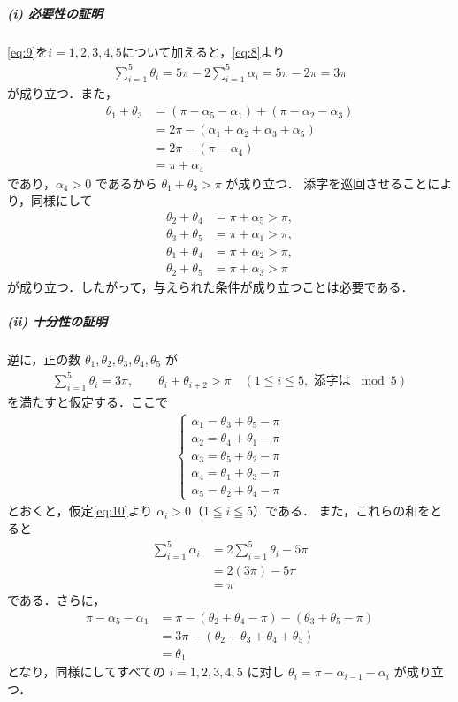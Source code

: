 \documentclass[../../main.tex]{subfiles}
\begin{document}
\subparagraph{(i) 必要性の証明}

\cref{eq:9}を$i=1,2,3,4,5$について加えると，\cref{eq:8}より
\begin{align}
  \sum_{i=1}^5 \theta_i = 5\pi - 2\sum_{i=1}^5 \alpha_i = 5\pi - 2\pi = 3\pi
\end{align}
が成り立つ．また，
\begin{align}
  \theta_1 + \theta_3 &= (\pi - \alpha_5 - \alpha_1) + (\pi - \alpha_2 - \alpha_3) \nonumber\\
  &= 2\pi - (\alpha_1 + \alpha_2 + \alpha_3 + \alpha_5) \nonumber\\
  &= 2\pi - (\pi - \alpha_4) \nonumber\\
  &= \pi + \alpha_4
\end{align}
であり，$\alpha_4 > 0$ であるから $\theta_1 + \theta_3 > \pi$ が成り立つ．
添字を巡回させることにより，同様にして
\begin{align}
  \theta_2 + \theta_4 &= \pi + \alpha_5 > \pi, \nonumber\\
  \theta_3 + \theta_5 &= \pi + \alpha_1 > \pi, \nonumber\\
  \theta_1 + \theta_4 &= \pi + \alpha_2 > \pi, \nonumber\\
  \theta_2 + \theta_5 &= \pi + \alpha_3 > \pi
\end{align}
が成り立つ．したがって，与えられた条件が成り立つことは必要である．

\subparagraph{(ii) 十分性の証明}

逆に，正の数 $\theta_1, \theta_2, \theta_3, \theta_4, \theta_5$ が
\begin{align}
  \sum_{i=1}^5 \theta_i = 3\pi, \qquad \theta_i + \theta_{i+2} > \pi \quad (1 \leqq i \leqq 5, \text{ 添字は } \bmod 5) \label{eq:10}
\end{align}
を満たすと仮定する．ここで
\begin{align}
  \begin{cases}
    \alpha_1 = \theta_3 + \theta_5 - \pi \\
    \alpha_2 = \theta_4 + \theta_1 - \pi \\
    \alpha_3 = \theta_5 + \theta_2 - \pi \\
    \alpha_4 = \theta_1 + \theta_3 - \pi \\
    \alpha_5 = \theta_2 + \theta_4 - \pi
  \end{cases}
\end{align}
とおくと，仮定\cref{eq:10}より $\alpha_i > 0$（$1 \leqq i \leqq 5$）である．
また，これらの和をとると
\begin{align}
  \sum_{i=1}^5 \alpha_i &= 2\sum_{i=1}^5 \theta_i - 5\pi \nonumber\\
  &= 2(3\pi) - 5\pi \nonumber\\
  &= \pi
\end{align}
である．さらに，
\begin{align}
  \pi - \alpha_5 - \alpha_1 &= \pi - (\theta_2 + \theta_4 - \pi) - (\theta_3 + \theta_5 - \pi) \nonumber\\
  &= 3\pi - (\theta_2 + \theta_3 + \theta_4 + \theta_5) \nonumber\\
  &= \theta_1
\end{align}
となり，同様にしてすべての $i=1,2,3,4,5$ に対し $\theta_i = \pi - \alpha_{i-1} - \alpha_i$ が成り立つ．
\end{document}
